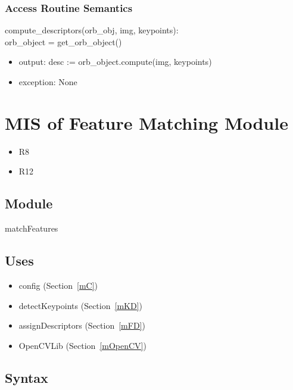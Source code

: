 \documentclass[12pt, titlepage]{article}
\begin{document}
\subsubsection{Access Routine Semantics}

\noindent compute\_descriptors(orb\_obj, img, keypoints):\\
orb\_object = get\_orb\_object()
\begin{itemize}
\item output: desc := orb\_object.compute(img, keypoints)
\item exception: None 
\end{itemize}




\newpage
\section{MIS of Feature Matching Module} \label{mFM}
\begin{itemize}
  \item R8
  \item R12
\end{itemize}
\subsection{Module}

matchFeatures

\subsection{Uses}
\begin{itemize}
  \item config (Section~\ref{mC})
  \item detectKeypoints (Section~\ref{mKD})
  \item assignDescriptors (Section~\ref{mFD})
  \item OpenCVLib (Section~\ref{mOpenCV})
\end{itemize}

\subsection{Syntax}
\end{document}
